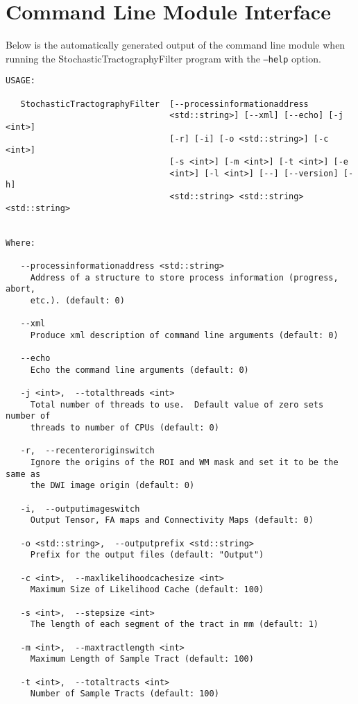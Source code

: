 \chapter{Command Line Module Interface}
Below is the automatically generated output of the command line module when running the StochasticTractographyFilter program with the \texttt{--help} option.

\begin{verbatim}
USAGE:

   StochasticTractographyFilter  [--processinformationaddress
                                 <std::string>] [--xml] [--echo] [-j <int>]
                                 [-r] [-i] [-o <std::string>] [-c <int>]
                                 [-s <int>] [-m <int>] [-t <int>] [-e
                                 <int>] [-l <int>] [--] [--version] [-h]
                                 <std::string> <std::string> <std::string>


Where:

   --processinformationaddress <std::string>
     Address of a structure to store process information (progress, abort,
     etc.). (default: 0)

   --xml
     Produce xml description of command line arguments (default: 0)

   --echo
     Echo the command line arguments (default: 0)

   -j <int>,  --totalthreads <int>
     Total number of threads to use.  Default value of zero sets number of
     threads to number of CPUs (default: 0)

   -r,  --recenteroriginswitch
     Ignore the origins of the ROI and WM mask and set it to be the same as
     the DWI image origin (default: 0)

   -i,  --outputimageswitch
     Output Tensor, FA maps and Connectivity Maps (default: 0)

   -o <std::string>,  --outputprefix <std::string>
     Prefix for the output files (default: "Output")

   -c <int>,  --maxlikelihoodcachesize <int>
     Maximum Size of Likelihood Cache (default: 100)

   -s <int>,  --stepsize <int>
     The length of each segment of the tract in mm (default: 1)

   -m <int>,  --maxtractlength <int>
     Maximum Length of Sample Tract (default: 100)

   -t <int>,  --totaltracts <int>
     Number of Sample Tracts (default: 100)


\end{verbatim}
